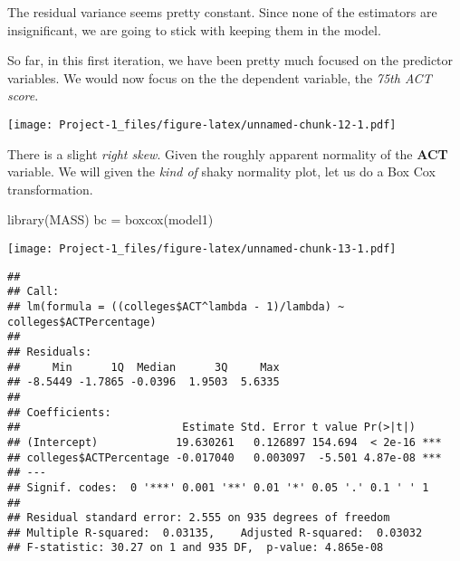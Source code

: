 \documentclass[
]{article}
\newenvironment{Shaded}{\begin{snugshade}}{\end{snugshade}}
\newcommand{\DecValTok}[1]{\textcolor[rgb]{0.00,0.00,0.81}{#1}}
\newcommand{\FunctionTok}[1]{\textcolor[rgb]{0.00,0.00,0.00}{#1}}
\newcommand{\NormalTok}[1]{#1}
\newcommand{\OtherTok}[1]{\textcolor[rgb]{0.56,0.35,0.01}{#1}}
\newcommand{\SpecialCharTok}[1]{\textcolor[rgb]{0.00,0.00,0.00}{#1}}
\begin{document}
The residual variance seems pretty constant. Since none of the
estimators are insignificant, we are going to stick with keeping them in
the model.

So far, in this first iteration, we have been pretty much focused on the
predictor variables. We would now focus on the the dependent variable,
the \emph{75th ACT score}.

\begin{Shaded}
\end{Shaded}

\texttt{[image: Project-1\_files/figure-latex/unnamed-chunk-12-1.pdf]}

There is a slight \emph{right skew}. Given the roughly apparent
normality of the \textbf{ACT} variable. We will given the \emph{kind of}
shaky normality plot, let us do a Box Cox transformation.

\begin{Shaded}
\begin{Highlighting}[]
\FunctionTok{library}\NormalTok{(MASS)}
\NormalTok{bc }\OtherTok{=} \FunctionTok{boxcox}\NormalTok{(model1)}
\end{Highlighting}
\end{Shaded}

\texttt{[image: Project-1\_files/figure-latex/unnamed-chunk-13-1.pdf]}

\begin{Shaded}
\end{Shaded}

\begin{verbatim}
## 
## Call:
## lm(formula = ((colleges$ACT^lambda - 1)/lambda) ~ colleges$ACTPercentage)
## 
## Residuals:
##     Min      1Q  Median      3Q     Max 
## -8.5449 -1.7865 -0.0396  1.9503  5.6335 
## 
## Coefficients:
##                         Estimate Std. Error t value Pr(>|t|)    
## (Intercept)            19.630261   0.126897 154.694  < 2e-16 ***
## colleges$ACTPercentage -0.017040   0.003097  -5.501 4.87e-08 ***
## ---
## Signif. codes:  0 '***' 0.001 '**' 0.01 '*' 0.05 '.' 0.1 ' ' 1
## 
## Residual standard error: 2.555 on 935 degrees of freedom
## Multiple R-squared:  0.03135,    Adjusted R-squared:  0.03032 
## F-statistic: 30.27 on 1 and 935 DF,  p-value: 4.865e-08
\end{verbatim}
\end{document}
